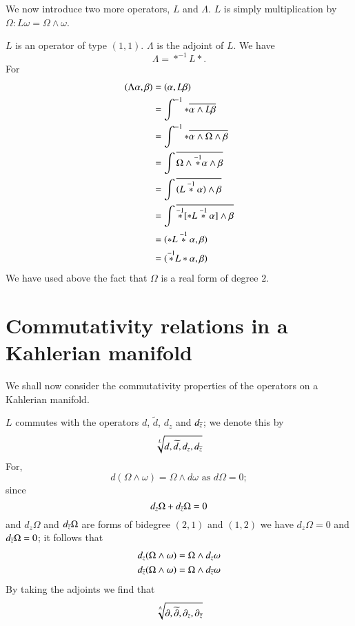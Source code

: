 We now introduce two more operators, $L$ and $\Lambda$. $L$ is simply
multiplication by $\Omega:L\omega=\Omega\wedge \omega$.

$L$ is an operator of type $(1,1)$. $\Lambda$ is the adjoint of
$L$. We have
$$
\Lambda=\ast^{-1}L\ast.
$$
For
\begin{align*}
(\Lambda\alpha,\beta) &= (\alpha,L\beta)\\
&= \int^{-1}\ast\overline{\alpha\wedge L\beta}\\
&= \int^{-1}\ast\overline{\alpha\wedge\Omega\wedge\beta}\\
&= \int\overline{\Omega\wedge\overset{-1}{\ast}\alpha\wedge \beta}\\
&=\int\overline{(L\overset{-1}{\ast}\alpha)\wedge\beta}\\
&=\int\overline{\overset{-1}{\ast}[\ast
      L\overset{-1}{\ast}\alpha]\wedge\beta}\\
&= (\ast L\overset{-1}{\ast}\alpha,\beta)\\
&= (\overset{-1}{\ast}L\ast\alpha,\beta)
\end{align*}\pageoriginale
We have used above the fact that $\Omega$ is a real form of degree
$2$.

\section*{Commutativity relations in a Kahlerian manifold}

We shall now consider the commutativity properties of the operators on
a Kahlerian manifold.

$L$ commutes with the operators $d$, $\widetilde{d}$, $d_{z}$ and
$d_{\overline{z}}$; we denote this by
$$
\sqrt[L]{d,\widetilde{d},d_{z},d_{\overline{z}}}
$$
For,
$$
d(\Omega\wedge\omega)=\Omega\wedge d\omega\text{ \  as \ } d\Omega=0;
$$
since
$$
d_{z}\Omega+d_{\overline{z}}\Omega=0
$$
and $d_{z}\Omega$ and $d_{\overline{z}}\Omega$ are forms of bidegree $(2,1)$
and $(1,2)$ we have $d_{z}\Omega=0$ and $d_{\overline{z}}\Omega=0$; it
follows that 
\begin{align*}
d_{z}(\Omega\wedge\omega) &= \Omega\wedge d_{z}\omega\\
d_{\overline{z}}(\Omega\wedge \omega) &= \Omega\wedge d_{\overline{z}}\omega
\end{align*}\pageoriginale
By taking the adjoints we find that
$$
\sqrt[\Lambda]{\partial,
  \widetilde{\partial},\partial_{z},\partial_{\overline{z}}}
$$

